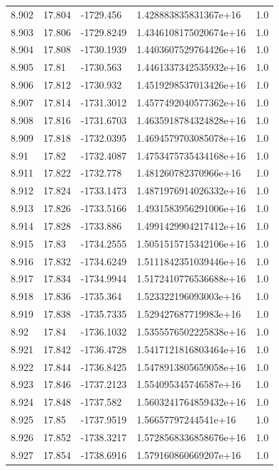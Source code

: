 \begin{tabular}{lllll}
8.902 & 17.804 & -1729.456 & 1.428883835831367e+16 & 1.0 \\
8.903 & 17.806 & -1729.8249 & 1.4346108175020674e+16 & 1.0 \\
8.904 & 17.808 & -1730.1939 & 1.4403607529764426e+16 & 1.0 \\
8.905 & 17.81 & -1730.563 & 1.4461337342535932e+16 & 1.0 \\
8.906 & 17.812 & -1730.932 & 1.4519298537013426e+16 & 1.0 \\
8.907 & 17.814 & -1731.3012 & 1.4577492040577362e+16 & 1.0 \\
8.908 & 17.816 & -1731.6703 & 1.4635918784324828e+16 & 1.0 \\
8.909 & 17.818 & -1732.0395 & 1.4694579703085078e+16 & 1.0 \\
8.91 & 17.82 & -1732.4087 & 1.4753475735434168e+16 & 1.0 \\
8.911 & 17.822 & -1732.778 & 1.481260782370966e+16 & 1.0 \\
8.912 & 17.824 & -1733.1473 & 1.4871976914026332e+16 & 1.0 \\
8.913 & 17.826 & -1733.5166 & 1.4931583956291006e+16 & 1.0 \\
8.914 & 17.828 & -1733.886 & 1.4991429904217412e+16 & 1.0 \\
8.915 & 17.83 & -1734.2555 & 1.5051515715342106e+16 & 1.0 \\
8.916 & 17.832 & -1734.6249 & 1.5111842351039446e+16 & 1.0 \\
8.917 & 17.834 & -1734.9944 & 1.5172410776536688e+16 & 1.0 \\
8.918 & 17.836 & -1735.364 & 1.523322196093003e+16 & 1.0 \\
8.919 & 17.838 & -1735.7335 & 1.529427687719983e+16 & 1.0 \\
8.92 & 17.84 & -1736.1032 & 1.5355576502225838e+16 & 1.0 \\
8.921 & 17.842 & -1736.4728 & 1.5417121816803464e+16 & 1.0 \\
8.922 & 17.844 & -1736.8425 & 1.5478913805659058e+16 & 1.0 \\
8.923 & 17.846 & -1737.2123 & 1.554095345746587e+16 & 1.0 \\
8.924 & 17.848 & -1737.582 & 1.5603241764859432e+16 & 1.0 \\
8.925 & 17.85 & -1737.9519 & 1.56657797244541e+16 & 1.0 \\
8.926 & 17.852 & -1738.3217 & 1.5728568336858676e+16 & 1.0 \\
8.927 & 17.854 & -1738.6916 & 1.579160860669207e+16 & 1.0 \\

\end{tabular}
